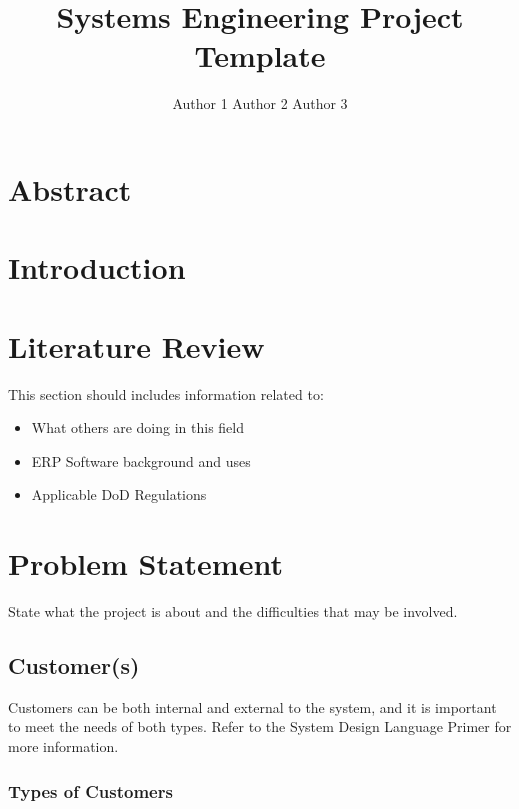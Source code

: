 \documentclass{ipfwpaper}
\author{Author 1\formatemail{Email 1} Author 2\formatemail{Email 2} Author 3\formatemail{Email 3}}
\title{Systems Engineering Project Template}
\begin{document}
 
\maketitle %


\startTable
{}
\AddRevision{}{}{}
\stopTable

\tableofcontents
\listoftables
\listoffigures
\printglossary[title=List of Acronyms ,type=\acronymtype]




 \section{Abstract}  %
 \section{Introduction} 
 
\section{Literature Review}
This section should includes information related to: 
\begin{itemize}
    \item What others are doing in this field
    \item ERP Software background and uses
    \item Applicable DoD Regulations
\end{itemize}

    \section{Problem Statement}
    State what the project is about and the difficulties that may be involved.
	\subsection{Customer(s)}
	Customers can be both internal and external to the system, and it is important to meet the needs of both types. Refer to the System Design Language Primer for more information. 
    	\subsubsection{Types of Customers}
\end{document}
